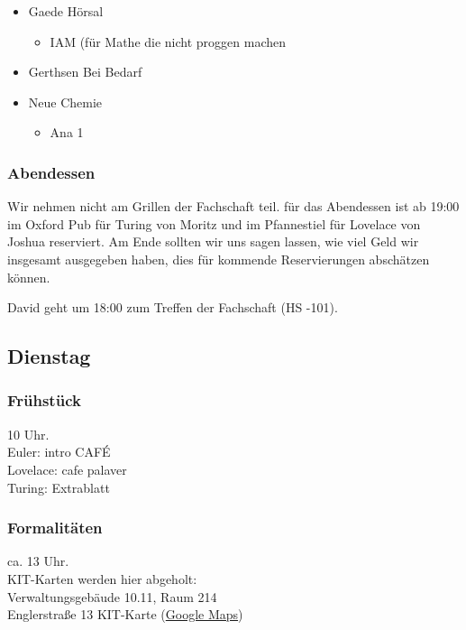 \documentclass[10pt,ngerman]{scrartcl}
\begin{document}
\begin{multicols}{2}
\begin{itemize}
    \item Gaede Hörsal
        \begin{itemize}
            \item IAM (für Mathe die nicht proggen machen
        \end{itemize}
    \item Gerthsen Bei Bedarf
    \item Neue Chemie
        \begin{itemize}
            \item Ana 1
        \end{itemize}
\end{itemize}

\subsubsection{Abendessen}

Wir nehmen nicht am Grillen der Fachschaft teil. für das Abendessen
ist ab 19:00 im Oxford Pub für Turing von Moritz und im Pfannestiel
für Lovelace von Joshua reserviert. Am Ende sollten wir uns sagen
lassen, wie viel Geld wir insgesamt ausgegeben haben, dies für kommende
Reservierungen abschätzen können.

David geht um 18:00 zum Treffen der Fachschaft (HS -101).



\subsection{Dienstag}

\subsubsection{Frühstück}

10 Uhr. \\
Euler: intro CAFÉ \\
Lovelace: cafe palaver \\
Turing: Extrablatt

\subsubsection{Formalitäten}

ca. 13 Uhr. \\
KIT-Karten werden hier abgeholt: \\
Verwaltungsgebäude 10.11, Raum 214 \\
Englerstraße 13 KIT-Karte
(\href{https://goo.gl/maps/qhAjKJah3wpiFEzq5}{Google Maps})


\end{multicols}
\end{document}
